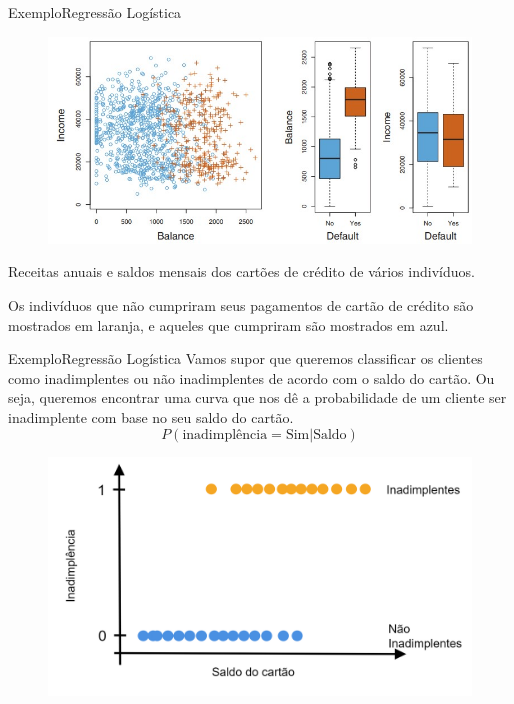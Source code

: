 \documentclass[t]{beamer}
\begin{document}

\begin{ftst}{Exemplo}{Regressão Logística}
\vone
\begin{figure}
    \centering
    \includegraphics[scale=0.5]{Figuras/slide05_04.jpg}
\end{figure}

Receitas anuais e saldos mensais dos cartões de crédito de vários indivíduos. 

Os indivíduos que não cumpriram seus pagamentos de cartão de crédito são mostrados em laranja, e aqueles que cumpriram são mostrados em azul. 


\end{ftst}


\begin{ftst}{Exemplo}{Regressão Logística}
Vamos supor que queremos classificar os clientes como inadimplentes ou não inadimplentes de acordo com o saldo do cartão.
\vone
Ou seja, queremos encontrar uma curva que nos dê a probabilidade de um cliente ser inadimplente com base no seu saldo do cartão.
\begin{equation}
    P(\text{inadimplência}=\text{Sim} | \text{Saldo})
\end{equation}

\begin{figure}
    \centering
    \includegraphics[scale=0.125]{Figuras/slide05_05.png}
\end{figure}


\end{ftst}
\end{document}
